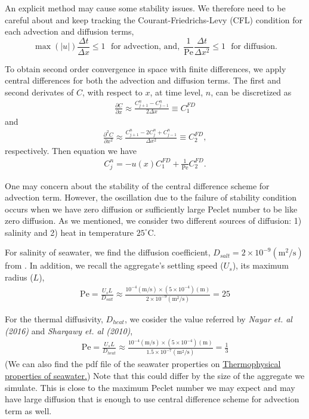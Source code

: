 An explicit method may cause some stability issues. We therefore need to be careful about and keep tracking the Courant-Friedrichs-Levy (CFL) condition for each advection and diffusion terms,
\begin{equation}
	\max(|u|) \frac{\Delta t}{\Delta x}  \leq 1 \ \ \ \text{for advection, and,}
	\ \  \frac{1}{\text{Pe}}\frac{\Delta t}{\Delta x^2}  \leq 1 \ \ \ \text{for diffusion}.
	\end{equation}
\par
To obtain second order convergence in space with finite differences, we apply  central differences for both the advection and diffusion terms. The first and second derivates of $C$, with respect to $x$, at time level, $n$, can be discretized as
\begin{align}
	\frac{\partial C}{\partial x}  \approx
	 \frac{C_{j+1}^{n} - C_{ j-1}^{n}}{2 \Delta x}
	 \equiv C_1^{FD}
	 \label{eq_c1_fd}
\end{align}
and
\begin{align}
	 \frac{\partial^2 C}{\partial x^2} \approx
	 \frac{C_{ j+1}^n -2 C_{j}^n + C_{ j-1}^n}{\Delta x^2}
	  \equiv C_2^{FD},
	 \label{eq_c2_fd}
\end{align}
respectively. 
Then equation we have
\begin{align}
	 C_{j}^n
	=  -u(x) C_1^{FD} + \frac{1}{\text{Pe}} C_2^{FD}.
\end{align}
\par
One may concern about the stability of the central difference scheme for advection term. However, the oscillation due to the failure of stability condition occurs when we have zero diffusion or sufficiently large Peclet number to be like zero diffusion. As we mentioned, we consider two different sources of diffusion: 1) salinity and 2) heat in temperature $25  ^{\circ}$C.
\par
For salinity of seawater, we find the diffusion coefficient, $D_{salt} = 2 \times 10^{-9}  (\text{m}^2\text{/s})$ from . In addition, we recall the aggregate's settling speed ($U_s$), its maximum radius ($L$),
\begin{align}
	\text{Pe} 
	= \frac{U_s L }{D_{salt}} 
	\approx \frac{10^{-4}(\text{m/s}) \times \left(5 \times 10^{-4} \right) (\text{m})}{2 \times 10^{-9} (\text{m}^2\text{/s})} = 25
\end{align}
\par 
For the thermal diffusivity, $D_{heat}$, we cosider the value referred by {\it Nayar et. al (2016)} and {\it Sharqawy et. al (2010)},
\begin{align}
	\text{Pe} 
	= \frac{U_s L }{D_{heat}} 
	\approx \frac{10^{-4}(\text{m/s}) \times \left(5 \times 10^{-4} \right) (\text{m})}{1.5 \times 10^{-7} (\text{m}^2\text{/s})} = \frac{1}{3}
\end{align}
(We can also find the pdf file of the seawater properties on \href{http://web.mit.edu/seawater/}{{\color{blue}Thermophysical properties of seawater}.})
Note that this could differ by the size of the aggregate we simulate. This is close to the maximum Peclet number we may expect and may have large diffusion that is enough to use central difference scheme for advection term as well. 
